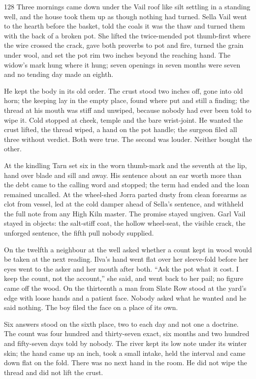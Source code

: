 \begin{CRchronicle}{128}
Three mornings came down under the Vail roof like silt settling in a standing well, and the house took them up as though nothing had turned. Sella Vail went to the hearth before the basket, told the coals it was the thaw and turned them with the back of a broken pot. She lifted the twice-mended pot thumb-first where the wire crossed the crack, gave both proverbs to pot and fire, turned the grain under wool, and set the pot rim two inches beyond the reaching hand. The widow’s mark hung where it hung; seven openings in seven months were seven and no tending day made an eighth.

He kept the body in its old order. The crust stood two inches off, gone into old horn; the keeping lay in the empty place, found where put and still a finding; the thread at his mouth was stiff and unwiped, because nobody had ever been told to wipe it. Cold stopped at cheek, temple and the bare wrist-joint. He wanted the crust lifted, the thread wiped, a hand on the pot handle; the surgeon filed all three without verdict. Both were true. The second was louder. Neither bought the other.

At the kindling Tarn set six in the worn thumb-mark and the seventh at the lip, hand over blade and sill and away. His sentence about an ear worth more than the debt came to the calling word and stopped; the term had ended and the loan remained uncalled. At the wheel-shed Jorra parted dusty from clean forearms as clot from vessel, led at the cold damper ahead of Sella’s sentence, and withheld the full note from any High Kiln master. The promise stayed ungiven. Garl Vail stayed in objects: the salt-stiff coat, the hollow wheel-seat, the visible crack, the unforged sentence, the fifth pull nobody supplied.

On the twelfth a neighbour at the well asked whether a count kept in wood would be taken at the next reading. Ilva’s hand went flat over her sleeve-fold before her eyes went to the asker and her mouth after both. “Ask the pot what it cost. I keep the count, not the account,” she said, and went back to her pail; no figure came off the wood. On the thirteenth a man from Slate Row stood at the yard’s edge with loose hands and a patient face. Nobody asked what he wanted and he said nothing. The boy filed the face on a place of its own.

Six answers stood on the sixth place, two to each day and not one a doctrine. The count was four hundred and thirty-seven exact, six months and two hundred and fifty-seven days told by nobody. The river kept its low note under its winter skin; the hand came up an inch, took a small intake, held the interval and came down flat on the fold. There was no next hand in the room. He did not wipe the thread and did not lift the crust.
\end{CRchronicle}
